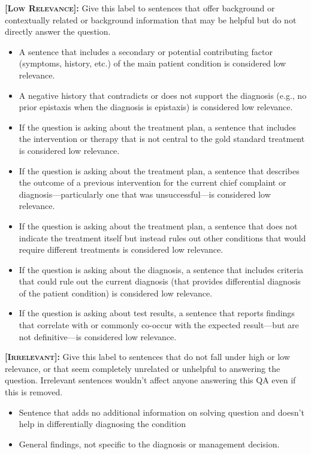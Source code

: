 \documentclass[11pt]{article}
\begin{document}
\begin{tcolorbox}[palebluebox]
\vspace{2mm}
\textbf{\textsc{[Low Relevance]: }}Give this label to sentences that offer background or contextually related or background information that may be helpful but do not directly answer the question.
\begin{itemize}
    \item A sentence that includes a secondary or potential contributing factor (symptoms, history, etc.) of the main patient condition is considered low relevance. 
    \item A negative history that contradicts or does not support the diagnosis (e.g., no prior epistaxis when the diagnosis is epistaxis) is considered low relevance.
    \item If the question is asking about the treatment plan, a sentence that includes the intervention or therapy that is not central to the gold standard treatment is considered low relevance.
    \item If the question is asking about the treatment plan, a sentence that describes the outcome of a previous intervention for the current chief complaint or diagnosis—particularly one that was unsuccessful—is considered low relevance.
    \item If the question is asking about the treatment plan, a sentence that does not indicate the treatment itself but instead rules out other conditions that would require different treatments is considered low relevance.
    \item If the question is asking about the diagnosis, a sentence that includes criteria that could rule out the current diagnosis (that provides differential diagnosis of the patient condition) is considered low relevance.
    \item If the question is asking about test results, a sentence that reports findings that correlate with or commonly co-occur with the expected result—but are not definitive—is considered low relevance.

\end{itemize}

\vspace{2mm}
\textbf{\textsc{[Irrelevant]: }}Give this label to sentences that do not fall under high or low relevance, or that seem completely unrelated or unhelpful to answering the question. Irrelevant sentences wouldn’t affect anyone answering this QA even if this is removed.
\begin{itemize}
    \item Sentence that adds no additional information on solving question and doesn’t help in differentially diagnosing the condition
    \item General findings, not specific to the diagnosis or management decision.
\end{itemize}



\end{tcolorbox}
\end{document}
